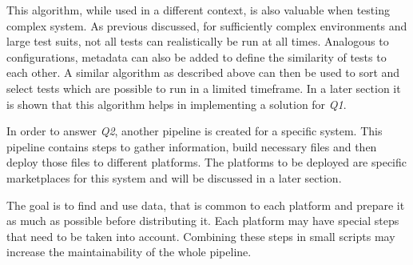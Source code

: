 This algorithm, while used in a different context, is also valuable when testing complex system.
As previous discussed, for sufficiently complex environments and large test suits, not all tests can realistically be run at all times.
Analogous to configurations, metadata can also be added to define the similarity of tests to each other.
A similar algorithm as described above can then be used to sort and select tests which are possible to run in a limited timeframe.
In a later section it is shown that this algorithm helps in implementing a solution for \textit{Q1}. %

In order to answer \textit{Q2}, another pipeline is created for a specific system.
This pipeline contains steps to gather information, build necessary files and then deploy those files to different platforms.
The platforms to be deployed are specific marketplaces for this system and will be discussed in a later section. %

The goal is to find and use data, that is common to each platform and prepare it as much as possible before distributing it.
Each platform may have special steps that need to be taken into account.
Combining these steps in small scripts may increase the maintainability of the whole pipeline.
